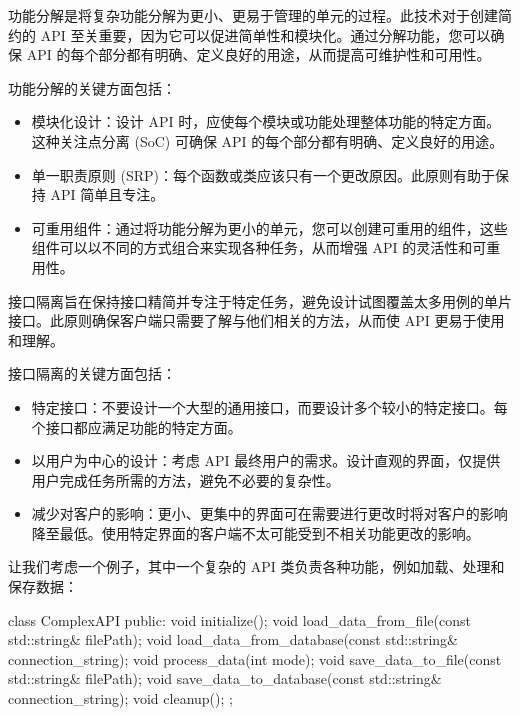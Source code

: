功能分解是将复杂功能分解为更小、更易于管理的单元的过程。此技术对于创建简约的 API 至关重要，因为它可以促进简单性和模块化。通过分解功能，您可以确保 API 的每个部分都有明确、定义良好的用途，从而提高可维护性和可用性。

功能分解的关键方面包括：

\begin{itemize}
\item
模块化设计：设计 API 时，应使每个模块或功能处理整体功能的特定方面。这种关注点分离 (SoC) 可确保 API 的每个部分都有明确、定义良好的用途。

\item
单一职责原则 (SRP)：每个函数或类应该只有一个更改原因。此原则有助于保持 API 简单且专注。

\item
可重用组件：通过将功能分解为更小的单元，您可以创建可重用的组件，这些组件可以以不同的方式组合来实现各种任务，从而增强 API 的灵活性和可重用性。
\end{itemize}

接口隔离旨在保持接口精简并专注于特定任务，避免设计试图覆盖太多用例的单片接口。此原则确保客户端只需要了解与他们相关的方法，从而使 API 更易于使用和理解。

接口隔离的关键方面包括：

\begin{itemize}
\item
特定接口：不要设计一个大型的通用接口，而要设计多个较小的特定接口。每个接口都应满足功能的特定方面。

\item
以用户为中心的设计：考虑 API 最终用户的需求。设计直观的界面，仅提供用户完成任务所需的方法，避免不必要的复杂性。

\item
减少对客户的影响：更小、更集中的界面可在需要进行更改时将对客户的影响降至最低。使用特定界面的客户端不太可能受到不相关功能更改的影响。
\end{itemize}

让我们考虑一个例子，其中一个复杂的 API 类负责各种功能，例如加载、处理和保存数据：

\begin{cpp}
class ComplexAPI {
public:
    void initialize();
    void load_data_from_file(const std::string& filePath);
    void load_data_from_database(const std::string& connection_string);
    void process_data(int mode);
    void save_data_to_file(const std::string& filePath);
    void save_data_to_database(const std::string& connection_string);
    void cleanup();
};
\end{cpp}

